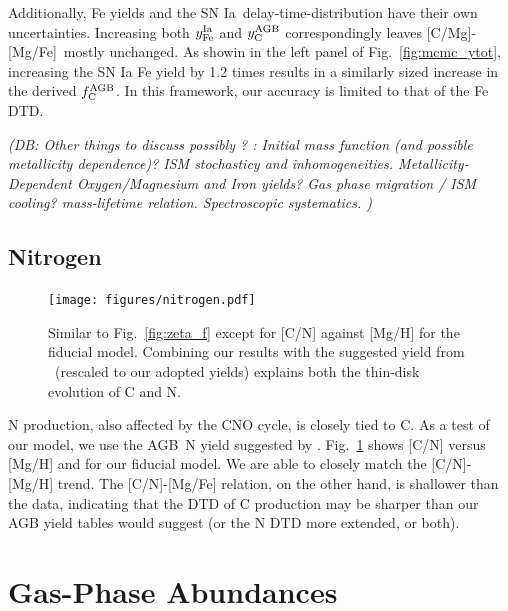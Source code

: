 \documentclass[fleqn,
referee, %
usenatbib]{mnras}
\newcommand{\JJ}{\citetalias{james+21}}
\newcommand{\agb}{AGB}
\newcommand{\ia}{SN Ia}
\newcommand{\caafe}{[C/Mg]-[Mg/Fe]}
\newcommand{\Ycagb}{{y_{\rm C}^{\rm AGB}}}
\newcommand{\fagb}{f_{\rm C}^{\rm AGB}}
\newcommand{\dbnote}[1]{ {\color{Thistle} \textit{\small (DB: #1)}} }
\begin{document}
Additionally, Fe yields and the \ia\  delay-time-distribution have their own uncertainties. Increasing both $y_{\rm Fe}^{\rm Ia}$ and $\Ycagb$ correspondingly leaves \caafe\ mostly unchanged. As showin in the left panel of Fig.~\ref{fig:mcmc_ytot}, increasing the SN Ia Fe yield by 1.2 times results in a similarly sized increase in the derived $\fagb$. In this framework, our accuracy is limited to that of the Fe DTD.

\dbnote{Other things to discuss possibly ? :
 Initial mass function (and possible metallicity dependence)? ISM stochasticy and inhomogeneities. Metallicity-Dependent Oxygen/Magnesium and Iron yields? Gas phase migration / ISM cooling?  mass-lifetime relation. Spectroscopic systematics.
 }


\subsection{Nitrogen}


\begin{figure}
\centering
\texttt{[image: figures/nitrogen.pdf]}

\caption[]{Similar to Fig.~\ref{fig:zeta_f} except for [C/N] against [Mg/H] for the fiducial model. Combining our results with the suggested yield from \JJ\ (rescaled to our adopted yields) explains both the thin-disk evolution of C and N. 
}
\label{fig:nitrogen}
\end{figure}

N production, also affected by the CNO cycle, is closely tied to C. As a test of our model, we use the \agb\ N yield suggested by \citet{james+23}. Fig.~\ref{fig:nitrogen} shows [C/N] versus [Mg/H] and for our fiducial model. We are able to closely match the [C/N]-[Mg/H] trend. 
The [C/N]-[Mg/Fe] relation, on the other hand, is shallower than the data, indicating that the DTD of C production may be sharper than our AGB yield tables would suggest (or the N DTD more extended, or both).


\section{Gas-Phase Abundances}\label{sec:gas}
\end{document}
